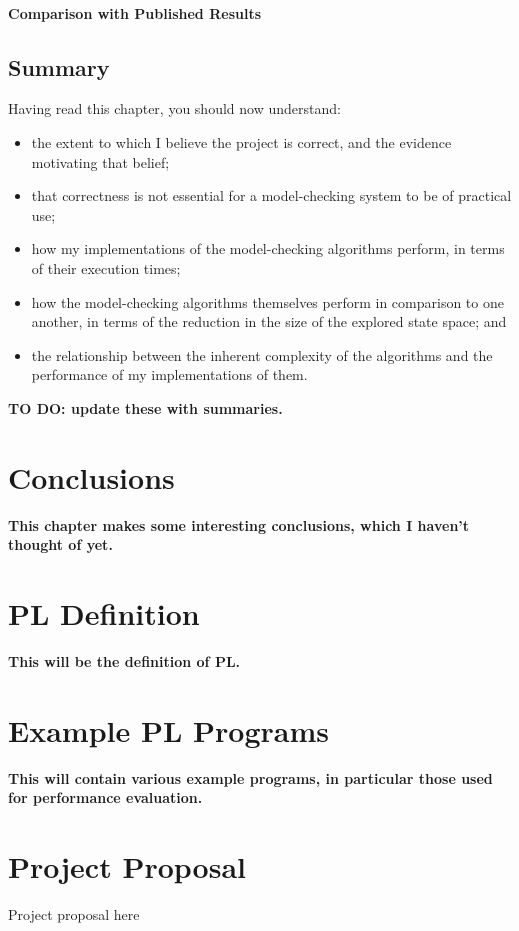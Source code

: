\documentclass[12pt,a4paper,twoside,openright]{report}
\newenvironment{understandinglist}
	{\begin{itemize} \itemsep 0em}{\end{itemize}}
\begin{document}
\subsubsection{Comparison with Published Results}

\section{Summary}
Having read this chapter,
you should now understand:
\begin{understandinglist}
	\item the extent to which I believe
	the project is correct, and the evidence
	motivating that belief;
	\item that correctness is not
	essential for a model-checking
	system to be of practical use;
	\item how my implementations
	of the model-checking algorithms
	perform, in terms of their
	execution times;
	\item how the model-checking
	algorithms themselves perform
	in comparison to one another,
	in terms of the reduction in the
	size of the explored state space; and
	\item the relationship between the
	inherent complexity of the
	algorithms and the performance of
	my implementations of them.
	\end{understandinglist}
\textbf{TO DO: update these with summaries.}

\chapter{Conclusions}

\textbf{This chapter makes some
	interesting conclusions, which I
	haven't thought of yet.}




\appendix

\chapter{PL Definition}
 
\textbf{This will be the definition
	of PL.}
 
\chapter{Example PL Programs}

\textbf{This will contain various
	example programs, in particular
	those used for performance evaluation.}

\chapter{Project Proposal}

Project proposal here
% 
\end{document}

